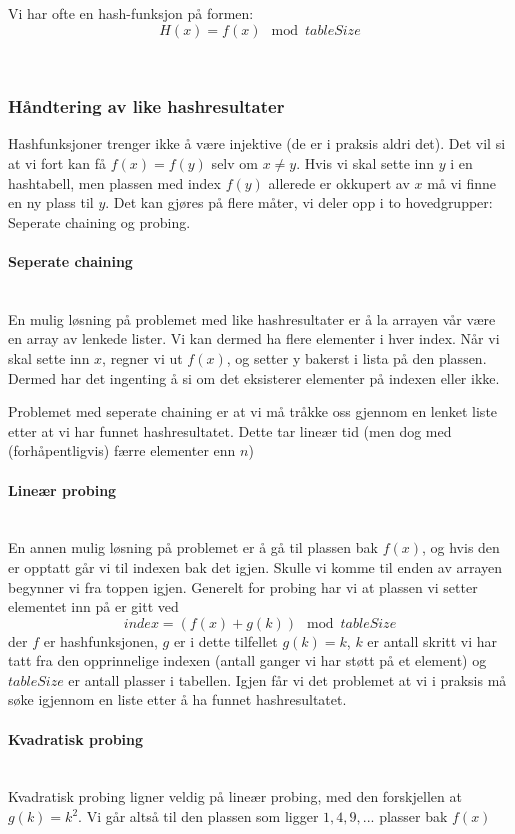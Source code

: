 \noindent Vi har ofte en hash-funksjon på formen:
\[ H(x) = f(x) \mod tableSize \]

~\\
\subsubsection{Håndtering av like hashresultater}
Hashfunksjoner trenger ikke å være injektive (de er i praksis aldri det). Det vil si at vi fort kan få $ f(x) = f(y) $ selv om $ x \neq y $. Hvis vi skal sette inn $ y $ i en hashtabell, men plassen med index $ f(y) $ allerede er okkupert av $ x $ må vi finne en ny plass til $ y $. Det kan gjøres på flere måter, vi deler opp i to hovedgrupper: Seperate chaining og probing. 


\paragraph{Seperate chaining}~\\
En mulig løsning på problemet med like hashresultater er å la arrayen vår være en array av lenkede lister. Vi kan dermed ha flere elementer i hver index. Når vi skal sette inn $ x $, regner vi ut $ f(x) $, og setter y bakerst i lista på den plassen. Dermed har det ingenting å si om det eksisterer elementer på indexen eller ikke. 

Problemet med seperate chaining er at vi må tråkke oss gjennom en lenket liste etter at vi har funnet hashresultatet. Dette tar lineær tid (men dog med (forhåpentligvis) færre elementer enn $ n $)


\paragraph{Lineær probing}~\\
En annen mulig løsning på problemet er å gå til plassen bak $ f(x) $, og hvis den er opptatt går vi til indexen bak det igjen. Skulle vi komme til enden av arrayen begynner vi fra toppen igjen. Generelt for probing har vi at plassen vi setter elementet inn på er gitt ved
\[ index = (f(x) + g(k)) \mod{tableSize} \]
der $ f $ er hashfunksjonen, $ g $ er i dette tilfellet $ g(k) = k $, $ k $ er antall skritt vi har tatt fra den opprinnelige indexen (antall ganger vi har støtt på et element) og $ tableSize $ er antall plasser i tabellen. Igjen får vi det problemet at vi i praksis må søke igjennom en liste etter å ha funnet hashresultatet. 

\paragraph{Kvadratisk probing}~\\
Kvadratisk probing ligner veldig på lineær probing, med den forskjellen at $ g(k) = k^2 $. Vi går altså til den plassen som ligger $ 1, 4, 9, ... $ plasser bak $ f(x) $

